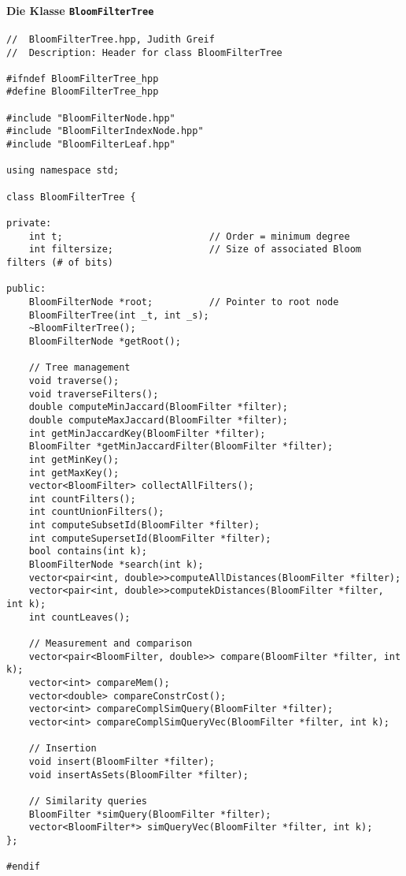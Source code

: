 \paragraph*{Die Klasse \texttt{BloomFilterTree}}
\small{
\begin{verbatim}
//  BloomFilterTree.hpp, Judith Greif
//  Description: Header for class BloomFilterTree

#ifndef BloomFilterTree_hpp
#define BloomFilterTree_hpp

#include "BloomFilterNode.hpp"
#include "BloomFilterIndexNode.hpp"
#include "BloomFilterLeaf.hpp"

using namespace std;

class BloomFilterTree {
    
private:
    int t;                          // Order = minimum degree
    int filtersize;                 // Size of associated Bloom filters (# of bits)
    
public:
    BloomFilterNode *root;          // Pointer to root node   
    BloomFilterTree(int _t, int _s);
    ~BloomFilterTree();   
    BloomFilterNode *getRoot();
    
    // Tree management
    void traverse();
    void traverseFilters();
    double computeMinJaccard(BloomFilter *filter);
    double computeMaxJaccard(BloomFilter *filter);
    int getMinJaccardKey(BloomFilter *filter);
    BloomFilter *getMinJaccardFilter(BloomFilter *filter);
    int getMinKey();
    int getMaxKey();
    vector<BloomFilter> collectAllFilters();
    int countFilters();
    int countUnionFilters(); 
    int computeSubsetId(BloomFilter *filter);
    int computeSupersetId(BloomFilter *filter);
    bool contains(int k);
    BloomFilterNode *search(int k);
    vector<pair<int, double>>computeAllDistances(BloomFilter *filter);
    vector<pair<int, double>>computekDistances(BloomFilter *filter, int k);
    int countLeaves(); 
    
    // Measurement and comparison
    vector<pair<BloomFilter, double>> compare(BloomFilter *filter, int k);
    vector<int> compareMem();
    vector<double> compareConstrCost();
    vector<int> compareComplSimQuery(BloomFilter *filter);
    vector<int> compareComplSimQueryVec(BloomFilter *filter, int k);
    
    // Insertion
    void insert(BloomFilter *filter);
    void insertAsSets(BloomFilter *filter);
    
    // Similarity queries
    BloomFilter *simQuery(BloomFilter *filter);
    vector<BloomFilter*> simQueryVec(BloomFilter *filter, int k);
};

#endif
\end{verbatim}
}
